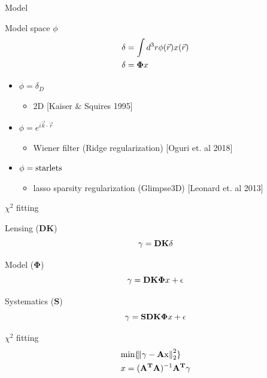 \documentclass[10pt]{beamer}
\begin{document}
\begin{frame}{ Model}
\begin{alertblock}{Model space $\phi$}
\begin{equation}\notag
\begin{split}
\delta&=\int d^3 r \phi(\vec{r}) x(\vec{r})\\
\delta&=\mathbf{\Phi} x
\end{split}
\end{equation}
\begin{itemize}
 \item $\phi = \delta_D$
 \begin{itemize}
    \item  2D [Kaiser \& Squires 1995]
 \end{itemize}
 \item $\phi = e^{i\vec{k}\cdot \vec{r}}$
 \begin{itemize}
    \item  Wiener filter (Ridge regularization) [Oguri et. al 2018]
 \end{itemize}
 \item $\phi = \rm{starlets}$
 \begin{itemize}
    \item  lasso sparsity regularization (Glimpse3D) [Leonard et. al 2013]
 \end{itemize}
\end{itemize}

\end{alertblock}
\end{frame}

\begin{frame}{$\chi^2$ fitting}
\begin{alertblock}{Lensing ($\mathbf{DK}$)}
\begin{equation}\notag
\gamma = \mathbf{D} \mathbf{K} \delta
\end{equation}
\end{alertblock}

\begin{alertblock}{Model ($\mathbf{\Phi}$)}
\begin{equation}\notag
\gamma = \mathbf{D} \mathbf{K} \mathbf{\Phi} x + \epsilon
\end{equation}
\end{alertblock}

\begin{alertblock}{Systematics ($\mathbf{S}$)}
\begin{equation}\notag
\gamma = \mathbf{S} \mathbf{D} \mathbf{K} \mathbf{\Phi} x + \epsilon
\end{equation}
\end{alertblock}

\begin{alertblock}{$\chi^2$ fitting}
\begin{equation}\notag
\begin{split}
&\rm{min} \{\norm{\gamma - \mathbf{A}x}^2_2\}\\
& x=(\mathbf{A^TA})^{-1} \mathbf{A^T} \gamma
\end{split}
\end{equation}
\end{alertblock}

\end{frame}
\end{document}
